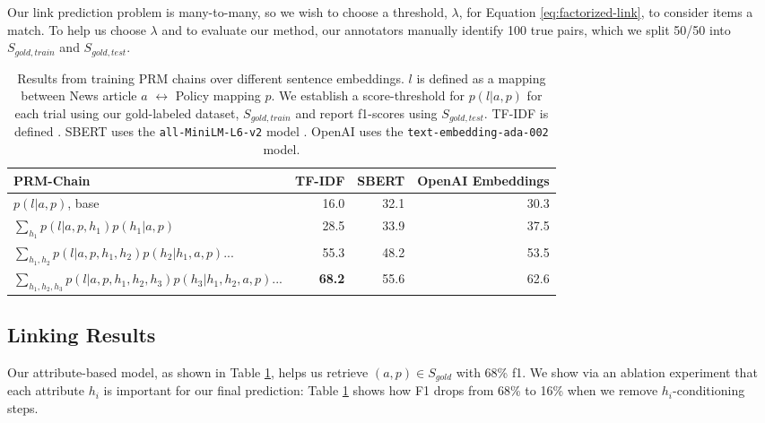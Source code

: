\documentclass[11pt]{article}
\begin{document}
Our link prediction problem is many-to-many, so we wish to choose a threshold, $\lambda$, for Equation \ref{eq:factorized-link}, to consider items a match. To help us choose $\lambda$ and to evaluate our method, our annotators manually identify 100 true pairs, which we split 50/50 into $S_{gold, train}$ and $S_{gold, test}$.

\begin{table}
    \centering
    \begin{tabularx}{\linewidth}{Xrrr}
    \toprule
    PRM-Chain & TF-IDF  & SBERT & OpenAI Embeddings\\
    \midrule
    $p(l | a, p)$, base & 16.0 & 32.1 & 30.3 \\ 
    $\sum_{h_1} p(l | a, p, h_1) p(h_1 | a, p)$ & 28.5 & 33.9  & 37.5 \\ 
    $\sum_{h_1, h_2} p(l | a, p, h_1, h_2) p(h_2 | h_1, a, p)...$ & 55.3 & 48.2 & 53.5 \\
    $\sum_{h_1, h_2, h_3} p(l | a, p, h_1, h_2, h_3) p(h_3 | h_1, h_2, a, p)...$ & \textbf{68.2} & 55.6 & 62.6 \\
    \bottomrule
    \end{tabularx}
    \caption{Results from training PRM chains over different sentence embeddings. $l$ is defined as a mapping between News article $a$ $\leftrightarrow$ Policy mapping $p$. We establish a score-threshold for $p(l | a, p)$ for each trial using our gold-labeled dataset, $S_{gold, train}$ and report f1-scores using $S_{gold, test}$. TF-IDF is defined . SBERT uses the \texttt{all-MiniLM-L6-v2} model \cite{reimers2019sentence}. OpenAI uses the \texttt{text-embedding-ada-002} model.}
    \label{tbl:part-1-results}
\end{table}

\subsection{Linking Results}
\label{sct:sct-1:results}

Our attribute-based model, as shown in Table \ref{tbl:part-1-results}, helps us retrieve $(a, p) \in S_{gold}$ with 68\% f1. We show via an ablation experiment that each attribute $h_i$ is important for our final prediction: Table \ref{tbl:part-1-results} shows how F1 drops from 68\% to 16\% when we remove $h_i$-conditioning steps.
\end{document}
